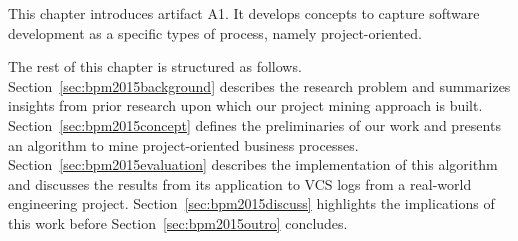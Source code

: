 This chapter introduces artifact A1. It develops concepts to capture software development as a specific types of process, namely project-oriented. 

The rest of this chapter is structured as follows. Section~\ref{sec:bpm2015background} describes the research problem and summarizes insights from prior research upon which our project mining approach is built. Section~\ref{sec:bpm2015concept} defines the preliminaries of our work and presents an algorithm to mine project-oriented business processes. Section~\ref{sec:bpm2015evaluation} describes the implementation of this algorithm and discusses the results from its application to VCS logs from a real-world engineering project. Section~\ref{sec:bpm2015discuss} highlights the implications of this work before Section~\ref{sec:bpm2015outro} concludes. 